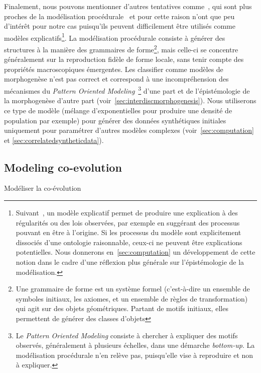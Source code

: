 {Finalement, nous pouvons mentionner d'autres tentatives comme~\cite{de2007netlogo,yamins2003growing}, qui sont plus proches de la modélisation procédurale~\cite{lechner2004procedural,watson2008procedural} et pour cette raison n'ont que peu d'intérêt pour notre cas puisqu'ils peuvent difficilement être utilisés comme modèles explicatifs\footnote{Suivant~\cite{varenne2017theories}, un modèle explicatif permet de produire une explication à des régularités ou des lois observées, par exemple en suggérant des processus pouvant en être à l'origine. Si les processus du modèle sont explicitement dissociés d'une ontologie raisonnable, ceux-ci ne peuvent être explications potentielles. Nous donnerons en~\ref{sec:computation} un développement de cette notion dans le cadre d'une réflexion plus générale sur l'épistémologie de la modélisation.}. La modélisation procédurale consiste à générer des structures à la manière des grammaires de forme\footnote{Une grammaire de forme est un système formel (c'est-à-dire un ensemble de symboles initiaux, les axiomes, et un ensemble de règles de transformation) qui agit sur des objets géométriques. Partant de motifs initiaux, elles permettent de générer des classes d'objets}, mais celle-ci se concentre généralement sur la reproduction fidèle de forme locale, sans tenir compte des propriétés macroscopiques émergentes. Les classifier comme modèles de morphogenèse n'est pas correct et correspond à une incompréhension des mécanismes du \emph{Pattern Oriented Modeling}~\cite{grimm2005pattern}\footnote{Le \emph{Pattern Oriented Modeling} consiste à chercher à expliquer des motifs observés, généralement à plusieurs échelles, dans une démarche \emph{bottom-up}. La modélisation procédurale n'en relève pas, puisqu'elle vise à reproduire et non à expliquer.} d'une part et de l'épistémologie de la morphogenèse d'autre part (voir~\ref{sec:interdiscmorphogenesis}). Nous utiliserons ce type de modèle (mélange d'exponentielles pour produire une densité de population par exemple) pour générer des données synthétiques initiales uniquement pour paramétrer d'autres modèles complexes (voir~\ref{sec:computation} et \ref{sec:correlatedsyntheticdata}).
}






\subsection{Modeling co-evolution}{Modéliser la co-évolution}



